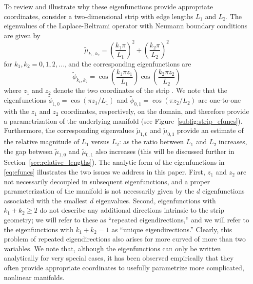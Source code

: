 \documentclass[3p]{elsarticle}
\begin{document}
To review and illustrate why these eigenfunctions provide appropriate coordinates, consider a two-dimensional strip with edge lengths $L_1$ and $L_2$.
%
The eigenvalues of the Laplace-Beltrami operator with Neumann boundary conditions are given by
\begin{equation} \label{eq:evals}
\tilde{\mu}_{k_1, k_2} = \left( \frac{k_1 \pi}{L_1} \right)^2 + \left( \frac{k_2 \pi}{L_2} \right)^2
\end{equation}
for $k_1, k_2 = 0, 1, 2, \dots$,
and the corresponding eigenfunctions are
\begin{equation} \label{eq:efuncs}
\tilde{\phi}_{k_1, k_2} = \cos \left( \frac{k_1 \pi z_1}{L_1} \right) \cos \left( \frac{k_2 \pi z_2}{L_2} \right)
\end{equation}
where $z_1$ and $z_2$ denote the two coordinates of the strip \cite{singer2008non}.
%
We note that the eigenfunctions $\tilde{\phi}_{1, 0} = \cos \left( {\pi z_1}/{L_1} \right)$ and
$\tilde{\phi}_{0, 1} = \cos \left( {\pi z_2}/{L_2} \right)$ are one-to-one with the $z_1$ and $z_2$ coordinates,
respectively, on the domain, and therefore provide a parametrization of the underlying manifold (see Figure~\ref{subfig:strip_efuncs}).
%
Furthermore, the corresponding eigenvalues $\tilde{\mu}_{1,0}$ and $\tilde{\mu}_{0,1}$ provide an estimate of the
relative magnitude of $L_1$ versus $L_2$: as the ratio between $L_1$ and $L_2$ increases,
the gap between $\tilde{\mu}_{1,0}$ and $\tilde{\mu}_{0,1}$ also increases
(this will be discussed further in Section~\ref{sec:relative_lengths}).
%
The analytic form of the eigenfunctions in \eqref{eq:efuncs} illustrates the two issues we address in this paper.
%
First, $z_1$ and $z_2$ are not necessarily decoupled in subsequent eigenfunctions,
and a proper parameterization of the manifold is not necessarily given by the $d$ eigenfunctions associated with the
smallest $d$ eigenvalues.
%
Second, eigenfunctions with $k_1+k_2 \ge 2$ do not describe any
additional directions intrinsic to the strip geometry; we will refer to these as ``repeated eigendirections,''
and we will refer to the eigenfunctions with $k_1+k_2 =1$ as ``unique eigendirections.''
%
Clearly, this problem of repeated eigendirections also arises for more curved of more than two variables.
%
We note that, although the eigenfunctions can only be written analytically for very special cases,
it has been observed empirically that they often provide appropriate coordinates
to usefully parametrize more complicated, nonlinear manifolds.
%
\end{document}
